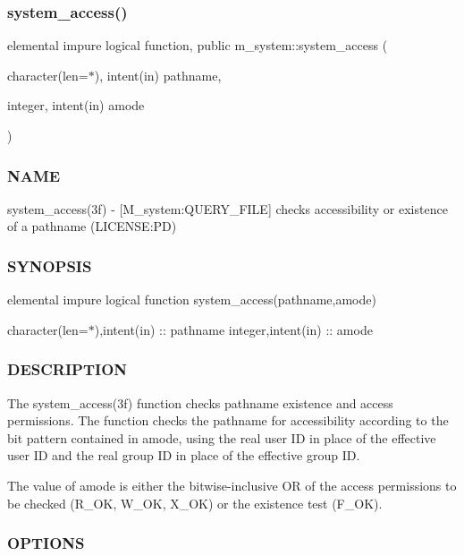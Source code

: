 \subsubsection{\texorpdfstring{system\+\_\+access()}{system\_access()}}
{\footnotesize\ttfamily elemental impure logical function, public m\+\_\+system\+::system\+\_\+access (\begin{DoxyParamCaption}\item[{character(len=$\ast$), intent(in)}]{pathname,  }\item[{integer, intent(in)}]{amode }\end{DoxyParamCaption})}



\subsubsection*{N\+A\+ME}

system\+\_\+access(3f) -\/ \mbox{[}M\+\_\+system\+:Q\+U\+E\+R\+Y\+\_\+\+F\+I\+LE\mbox{]} checks accessibility or existence of a pathname (L\+I\+C\+E\+N\+SE\+:PD) 

\subsubsection*{S\+Y\+N\+O\+P\+S\+IS}

elemental impure logical function system\+\_\+access(pathname,amode)

character(len=$\ast$),intent(in) \+:\+: pathname integer,intent(in) \+:\+: amode

\subsubsection*{D\+E\+S\+C\+R\+I\+P\+T\+I\+ON}

\begin{DoxyVerb}The system_access(3f) function checks pathname existence and access
permissions. The function checks the pathname for accessibility
according to the bit pattern contained in amode, using the real user
ID in place of the effective user ID and the real group ID in place
of the effective group ID.

The value of amode is either the bitwise-inclusive OR of the access
permissions to be checked (R_OK, W_OK, X_OK) or the existence test (F_OK).
\end{DoxyVerb}


\subsubsection*{O\+P\+T\+I\+O\+NS}

